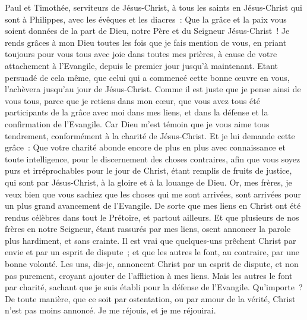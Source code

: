 \begin{multicols}{2}
\VerseOne{}Paul et Timothée, serviteurs de Jésus-Christ, à tous les saints en Jésus-Christ qui sont à Philippes, avec les évêques et les diacres~:
Que la grâce et la paix vous soient données de la part de Dieu, notre Père et du Seigneur Jésus-Christ~!
Je rends grâces à mon Dieu toutes les fois que je fais mention de vous,
en priant toujours pour vous tous avec joie dans toutes mes prières,
à cause de votre attachement à l'Evangile, depuis le premier jour jusqu'à maintenant.
Etant persuadé de cela même, que celui qui a commencé cette bonne œuvre en vous, l'achèvera jusqu'au jour de Jésus-Christ.
Comme il est juste que je pense ainsi de vous tous, parce que je retiens dans mon cœur, que vous avez tous été participants de la grâce avec moi dans mes liens, et dans la défense et la confirmation de l'Evangile.
Car Dieu m'est témoin que je vous aime tous tendrement, conformément à la charité de Jésus-Christ.
Et je lui demande cette grâce~: Que votre charité abonde encore de plus en plus avec connaissance et toute intelligence,
pour le discernement des choses contraires, afin que vous soyez purs et irréprochables pour le jour de Christ,
étant remplis de fruits de justice, qui sont par Jésus-Christ, à la gloire et à la louange de Dieu.
Or, mes frères, je veux bien que vous sachiez que les choses qui me sont arrivées, sont arrivées pour un plus grand avancement de l'Evangile.
De sorte que mes liens en Christ ont été rendus célèbres dans tout le Prétoire, et partout ailleurs. 
Et que plusieurs de nos frères en notre Seigneur, étant rassurés par mes liens, osent annoncer la parole plus hardiment, et sans crainte. 
Il est vrai que quelques-uns prêchent Christ par envie et par un esprit de dispute~; et que les autres le font, au contraire, par une bonne volonté. 
Les uns, dis-je, annoncent Christ par un esprit de dispute, et non pas purement, croyant ajouter de l'affliction à mes liens.
Mais les autres le font par charité, sachant que je suis établi pour la défense de l'Evangile.
Qu'importe~? De toute manière, que ce soit par ostentation, ou par amour de la vérité, Christ n'est pas moins annoncé. Je me réjouis, et je me réjouirai.

\end{multicols}
